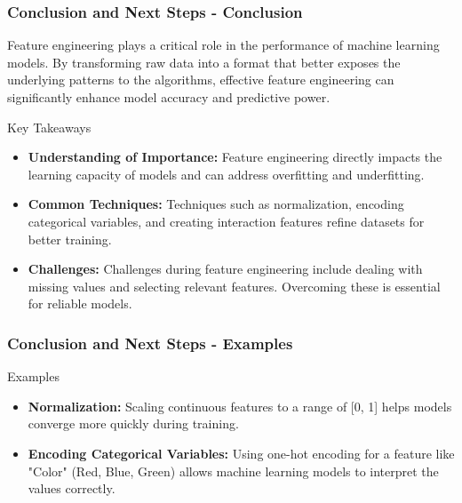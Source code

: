 \documentclass[aspectratio=169]{beamer}
\begin{document}
\begin{frame}[fragile]
  \frametitle{Conclusion and Next Steps - Conclusion}
  
  Feature engineering plays a critical role in the performance of machine learning models. By transforming raw data into a format that better exposes the underlying patterns to the algorithms, effective feature engineering can significantly enhance model accuracy and predictive power.
  
  \begin{block}{Key Takeaways}
    \begin{itemize}
      \item \textbf{Understanding of Importance:} Feature engineering directly impacts the learning capacity of models and can address overfitting and underfitting.
      \item \textbf{Common Techniques:} Techniques such as normalization, encoding categorical variables, and creating interaction features refine datasets for better training.
      \item \textbf{Challenges:} Challenges during feature engineering include dealing with missing values and selecting relevant features. Overcoming these is essential for reliable models.
    \end{itemize}
  \end{block}
\end{frame}

\begin{frame}[fragile]
  \frametitle{Conclusion and Next Steps - Examples}
  
  \begin{block}{Examples}
    \begin{itemize}
      \item \textbf{Normalization:} Scaling continuous features to a range of [0, 1] helps models converge more quickly during training.
      \item \textbf{Encoding Categorical Variables:} Using one-hot encoding for a feature like "Color" (Red, Blue, Green) allows machine learning models to interpret the values correctly.
    \end{itemize}
  \end{block}
\end{frame}
\end{document}
